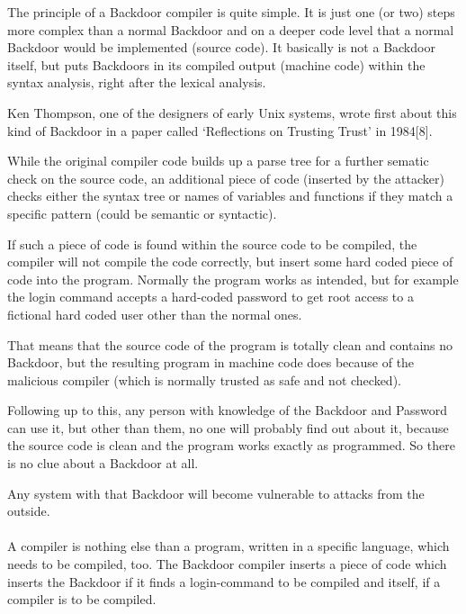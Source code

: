 \documentclass[a4paper, 12pt]{article}
\begin{document}
The principle of a Backdoor compiler is quite simple. It is just one (or two) steps more complex than a normal Backdoor and on a deeper code level that a normal Backdoor would be implemented (source code).
It basically is not a Backdoor itself, but puts Backdoors in its compiled output (machine code) within the syntax analysis, right after the lexical analysis.

Ken Thompson, one of the designers of early Unix systems, wrote first about this kind of Backdoor in a paper called `Reflections on Trusting Trust' in 1984[8].

While the original compiler code builds up a parse tree for a further sematic check on the source code, an additional piece of code (inserted by the attacker) checks either the syntax tree or names of variables and functions if they match a specific pattern (could be semantic or syntactic).

If such a piece of code is found within the source code to be compiled, the compiler will not compile the code correctly, but insert some hard coded piece of code into the program. Normally the program works as intended, but for example the login command accepts a hard-coded password to get root access to a fictional hard coded user other than the normal ones.

That means that the source code of the program is totally clean and contains no Backdoor, but the resulting program in machine code does because of the malicious compiler (which is normally trusted as safe and not checked). 

Following up to this, any person with knowledge of the Backdoor and Password can use it, but other than them, no one will probably find out about it, because the source code is clean and the program works exactly as programmed. So there is no clue about a Backdoor at all.

Any system with that Backdoor will become vulnerable to attacks from the outside.
\\
\\
A compiler is nothing else than a program, written in a specific language, which needs to be compiled, too. The Backdoor compiler inserts a piece of code which inserts the Backdoor if it finds a login-command to be compiled and itself, if a compiler is to be compiled.

\newpage
\end{document}
